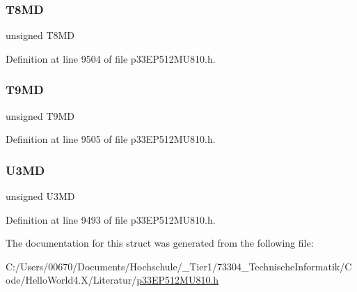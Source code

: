 \mbox{\label{structtag_p_m_d3_b_i_t_s_a8c32b7e20a750f3cd99d2090792e83b8}} 
\subsubsection{\texorpdfstring{T8\+MD}{T8MD}}
{\footnotesize\ttfamily unsigned T8\+MD}



Definition at line 9504 of file p33\+E\+P512\+M\+U810.\+h.

\mbox{\label{structtag_p_m_d3_b_i_t_s_aa389f814b1a07a4a6e1a99e1b453e212}} 
\subsubsection{\texorpdfstring{T9\+MD}{T9MD}}
{\footnotesize\ttfamily unsigned T9\+MD}



Definition at line 9505 of file p33\+E\+P512\+M\+U810.\+h.

\mbox{\label{structtag_p_m_d3_b_i_t_s_a2d90cb556ec531738b99f8ce71c8d287}} 
\subsubsection{\texorpdfstring{U3\+MD}{U3MD}}
{\footnotesize\ttfamily unsigned U3\+MD}



Definition at line 9493 of file p33\+E\+P512\+M\+U810.\+h.



The documentation for this struct was generated from the following file\+:\begin{DoxyCompactItemize}
\item 
C\+:/\+Users/00670/\+Documents/\+Hochschule/\+\_\+\+Tier1/73304\+\_\+\+Technische\+Informatik/\+Code/\+Hello\+World4.\+X/\+Literatur/\hyperlink{p33_e_p512_m_u810_8h}{p33\+E\+P512\+M\+U810.\+h}\end{DoxyCompactItemize}
